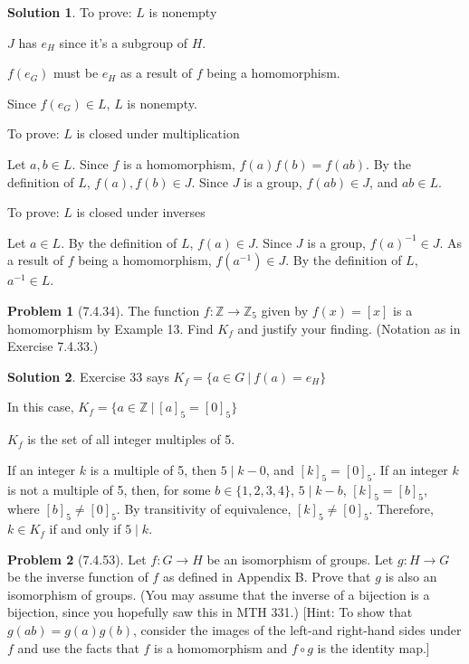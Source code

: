 \documentclass[12pt]{article}
\theoremstyle{definition}
\newtheorem*{prob}{Problem}
\newtheorem*{soln}{Solution}
\newcommand{\ZZ}{{\mathbb{Z}}}
\begin{document}
\begin{soln}

To prove: $L$ is nonempty

$J$ has $e_H$ since it's a subgroup of $H$.

$f(e_G)$ must be $e_H$ as a result of $f$ being a homomorphism.

Since $f(e_G)\in L$, $L$ is nonempty.

To prove: $L$ is closed under multiplication

Let $a, b\in L$.  Since $f$ is a homomorphism, $f(a)f(b)=f(ab)$.
By the definition of $L$, $f(a), f(b)\in J$.
Since $J$ is a group, $f(ab)\in J$, and $ab\in L$.

To prove: $L$ is closed under inverses

Let $a\in L$.
By the definition of $L$, $f(a)\in J$.
Since $J$ is a group, $f(a)^{-1}\in J$.
As a result of $f$ being a homomorphism, $f(a^{-1})\in J$.
By the definition of $L$, $a^{-1}\in L$.

\end{soln}

\begin{prob}[7.4.34]
The function $f:\ZZ \to \ZZ_5$ given by $f(x) = [x]$ is a homomorphism by Example 13. 
Find $K_f$ 
and justify your finding. (Notation as in Exercise 7.4.33.)
\end{prob}

\begin{soln}

Exercise 33 says $K_f=\{a\in G\ |\ f(a)=e_H\}$

In this case, $K_f=\{a\in \ZZ\ |\ [a]_5=[0]_5\}$

$K_f$ is the set of all integer multiples of 5.

If an integer $k$ is a multiple of 5, then $5\mid k-0$, and $[k]_5=[0]_5$.
If an integer $k$ is not a multiple of 5, then,
for some $b\in\{1,2,3,4\}$, $5\mid k-b$,
$[k]_5=[b]_5$, where $[b]_5\neq [0]_5$.
By transitivity of equivalence, $[k]_5\neq [0]_5$.
Therefore, $k\in K_f$ if and only if $5\mid k$.

\end{soln}




\begin{prob}[7.4.53]
Let $f:G \to H$ be an isomorphism of  groups. Let $g:H \to G$ 
be the inverse function of  $f$ as defined in Appendix B. 
Prove that $g$ is also an isomorphism of  groups. 
(You may assume that the inverse of a bijection is a bijection, since
you hopefully saw this in MTH 331.)
[Hint: To show that $g(ab) = g(a)g(b)$, 
consider the images of  the left-and right-hand sides under $f$ and use the facts 
that $f$ is a homomorphism and $f \circ g$ is the identity map.]
\end{prob}
\end{document}
